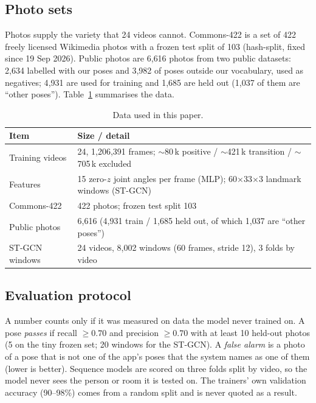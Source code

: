 \subsection{Photo sets}
Photos supply the variety that 24 videos cannot. Commons-422 is a set of 422 freely licensed Wikimedia photos with a frozen test split of 103 (hash-split, fixed since 19 Sep 2026). Public photos are 6{,}616 photos from two public datasets: 2{,}634 labelled with our poses and 3{,}982 of poses outside our vocabulary, used as negatives; 4{,}931 are used for training and 1{,}685 are held out (1{,}037 of them are ``other poses''). Table~\ref{tab:data} summarises the data.
\begin{table}[t]
\centering\footnotesize
\caption{Data used in this paper.}\label{tab:data}
\begin{tabularx}{\columnwidth}{@{}lX@{}}
\toprule
Item & Size / detail \\ \midrule
Training videos & 24, 1{,}206{,}391 frames; $\sim$80\,k positive / $\sim$421\,k transition / $\sim$705\,k excluded \\
Features & 15 zero-$z$ joint angles per frame (MLP); 60$\times$33$\times$3 landmark windows (ST-GCN) \\
Commons-422 & 422 photos; frozen test split 103 \\
Public photos & 6{,}616 (4{,}931 train / 1{,}685 held out, of which 1{,}037 are ``other poses'') \\
ST-GCN windows & 24 videos, 8{,}002 windows (60 frames, stride 12), 3 folds by video \\ \bottomrule
\end{tabularx}
\end{table}

\subsection{Evaluation protocol}
A number counts only if it was measured on data the model never trained on. A pose \emph{passes} if recall $\ge0.70$ and precision $\ge0.70$ with at least 10 held-out photos (5 on the tiny frozen set; 20 windows for the ST-GCN). A \emph{false alarm} is a photo of a pose that is not one of the app's poses that the system names as one of them (lower is better). Sequence models are scored on three folds split by video, so the model never sees the person or room it is tested on. The trainers' own validation accuracy (90--98\%) comes from a random split and is never quoted as a result.
